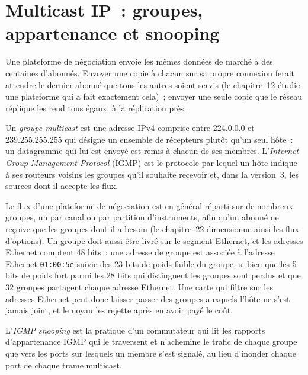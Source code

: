 \label{lst:nw:networking-for-trading:frame}

\section{Multicast IP~: groupes, appartenance et snooping}

Une plateforme de négociation envoie les mêmes données de marché à des centaines d'abonnés. Envoyer une copie à chacun sur sa propre connexion ferait
attendre le dernier abonné que tous les autres soient servis (le chapitre~12 étudie une plateforme qui a fait exactement cela)~; envoyer une seule copie que le réseau réplique
les rend tous égaux, à la réplication près.

\begin{definition}\label{def:nw:networking-for-trading:group}
Un \emph{groupe multicast} est une adresse IPv4 comprise entre 224.0.0.0 et 239.255.255.255 qui désigne un ensemble
de récepteurs plutôt qu'un seul hôte~: un datagramme qui lui est envoyé est remis à chacun de ses membres. L'\emph{Internet Group Management
Protocol} (IGMP) est le protocole par lequel un hôte indique à ses routeurs voisins
les groupes qu'il souhaite recevoir et, dans la version~3, les sources dont il accepte les flux.
\end{definition}

Le flux d'une plateforme de négociation est en général réparti sur de nombreux groupes, un par canal ou par partition d'instruments,
afin qu'un abonné ne reçoive que les groupes dont il a besoin (le chapitre~22 dimensionne ainsi les flux d'options). Un groupe doit aussi être livré sur le segment Ethernet,
et les adresses Ethernet comptent 48 bits~: une adresse de groupe est associée à l'adresse Ethernet \texttt{01:00:5e} suivie des 23 bits de poids faible du groupe,
si bien que les 5 bits de poids fort parmi les 28 bits qui distinguent les groupes sont perdus et que 32 groupes partagent chaque adresse Ethernet.
Une carte qui filtre sur les adresses Ethernet peut donc laisser passer des groupes auxquels l'hôte ne s'est jamais joint,
et le noyau les rejette après en avoir payé le coût.

\begin{definition}\label{def:nw:networking-for-trading:snooping}
L'\emph{IGMP snooping} est la pratique d'un commutateur qui lit les rapports d'appartenance IGMP qui le traversent et
n'achemine le trafic de chaque groupe que vers les ports sur lesquels un membre s'est signalé, au lieu d'inonder
chaque port de chaque trame multicast.
\end{definition}


